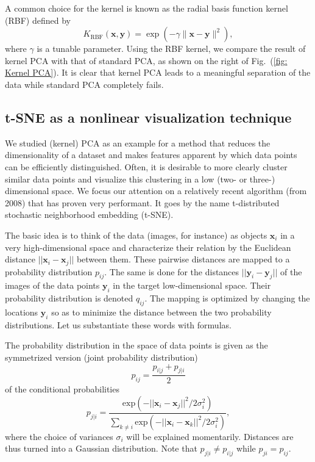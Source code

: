 A common choice for the kernel is known as the radial basis function kernel (RBF) defined by
\begin{equation}
    K_{\textrm{RBF}}(\bm{x},\bm{y}) = \exp\left( -\gamma \| \bm{x} - \bm{y}\|^{2} \right),
\end{equation}
where $\gamma$ is a tunable parameter. Using the RBF kernel, we compare the result of kernel PCA with that of standard PCA, as shown on the right of Fig.~(\ref{fig: Kernel PCA}). It is clear that kernel PCA leads to a meaningful separation of the data while standard PCA completely fails.

\subsection{t-SNE as a nonlinear visualization technique}


We studied (kernel) PCA as an example for a method that reduces the dimensionality of a dataset and makes features apparent by which data points can be efficiently distinguished. 
Often, it is desirable to more clearly cluster similar data points and visualize this clustering in a low (two- or three-) dimensional space. We focus our attention on a relatively recent algorithm (from 2008) that has proven very performant. It goes by the name t-distributed stochastic neighborhood embedding (t-SNE). 

The basic idea is to think of the data (images, for instance) as objects $\bm{x}_i$ in a very high-dimensional space and characterize their relation by the Euclidean distance $||\bm{x}_i-\bm{x}_j||$ between them. These pairwise distances are mapped to a probability distribution $p_{ij}$. The same is done for the distances $||\bm{y}_i-\bm{y}_j||$ of the images of the data points $\bm{y}_i$ in the target low-dimensional space. Their probability distribution is denoted $q_{ij}$. The mapping is optimized by changing the locations $\bm{y}_i$ so as to minimize the distance between the two probability distributions. Let us substantiate these words with formulas. 

The probability distribution in the space of data points is given as the symmetrized version (joint probability distribution)
\begin{equation}
p_{ij}=\frac{p_{i|j}+p_{j|i}}{2}
\end{equation}
of the conditional probabilities 
\begin{equation}
p_{j|i}=\frac{\mathrm{exp}\left(-||\bm{x}_i-\bm{x}_j||^2/2\sigma_i^2\right)}
{\sum_{k\neq i}\mathrm{exp}\left(-||\bm{x}_i-\bm{x}_k||^2/2\sigma_i^2\right)},
\end{equation}
where the choice of variances $\sigma_i$ will be explained momentarily. Distances are thus turned into a Gaussian distribution. Note that $p_{j|i}\neq p_{i|j}$ while $p_{ji}= p_{ij}$.

